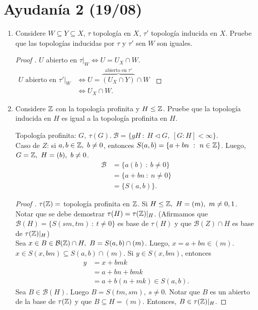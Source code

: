 
\section{Ayudanía 2 (19/08)}

\begin{enumerate}
	\item Considere $W \subseteq Y \subseteq X$, $\tau$ topología en $X$, $\tau'$ topología inducida en $X$. Pruebe que las topologías inducidas por $\tau$ y $\tau'$ sen $W$ son iguales.
	\begin{proof}[Proof ]
		$U$ abierto en $\tau|_{W} \iff U = U_X \cap W$.\\
		$\begin{aligned}
			U \text{ abierto en } \tau'|_{W} & \iff U = \overbrace{(U_X \cap Y)}^{\text{abierto en } \tau'} \cap W \\
			& \iff U_X \cap W
		.\end{aligned}$
	\end{proof}

	\item Considere $\mathbb{Z}$ con la topología profinita y $H \leq \mathbb{Z}$. Pruebe que la topología inducida en $H$ es igual a la topología profinita en $H$.
	\begin{remark}
		Topología profinita: $G,\ \tau (G).\ \mathcal{B} = \{ gH \ : \ H \lhd G, \ [G : H] < \infty \}$. \\
		\noindent Caso de $Z$: si $a,b \in \mathbb{Z},\ b\neq 0$, entonces $S(a,b) = \{ a+bn \ : \ n \in \mathbb{Z} \}$. Luego, $G = \mathbb{Z},\ H = (b),\ b\neq 0$.
		\begin{align*}
			\mathcal{B} & = \{ a(b) \ : \ b \neq 0 \} \\
			& = \{ a+bn \ : \ n \neq 0 \} \\
			& = \{ S(a,b) \}  
		.\end{align*}
	\end{remark}
	\begin{proof}[Proof ]
		$\tau (\mathbb{Z}) =$ topología profinita en $\mathbb{Z}$. Si $H \leq \mathbb{Z},\ H = (m),\ m \neq 0,1$. Notar que se debe demostrar $\tau (H) = \tau (\mathbb{Z})|_{H}$. (Afirmamos que $\mathcal{B}(H) = \{ S(sm,tm) \ : \ t \neq 0 \}$ es base de $\tau (H)$ y que $\mathcal{B}(Z) \cap H$ es base de $\tau(\mathbb{Z})|_{H}$) \\
		\noindent \fbox{$\supseteq$} Sea $x \in  B \in \mathcal{B}(\mathbb{Z}) \cap H,\ B = S(a,b) \cap (m)$. Luego, $x = a + bn \in (m)$. $x \in S(x,bm) \subseteq S(a,b) \cap (m)$. Si $y \in S(x,bm)$, entonces
		\begin{align*}
			y & = x + bmk \\
			& = a + bn + bmk \\
			& = a + b(n+mk) \in S(a,b)
		.\end{align*}
		\noindent \fbox{$\subseteq$} Sea $B \in \mathcal{B}(H)$. Luego $B= S(tm,sm),\ s \neq 0$. Notar que $B$ es un abierto de la base de $\tau(\mathbb{Z})$ y que $B \subseteq H = (m)$. Entonces, $B \in \tau (\mathbb{Z})|_{H}$.
	\end{proof}


\end{enumerate}
